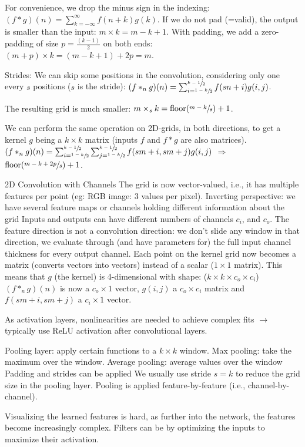 For convenience, we drop the minus sign in the indexing: $(f*g)(n)= \sum_{k=-\infty}^{\infty} f(n+k)g(k)$.
If we do not pad (=valid), the output is smaller than the input:
$m\times k=m-k+1$.
With  padding, we add a zero-padding of size $p=\frac{(k-1)}{2}$ on both ends: $(m+p)\times k = (m-k+1)+2p = m$.

Strides: We can skip some positions in the convolution, considering only one every $s$ positions ($s$ is the stride):
$(f*_n g)(n)= \sum_{i=\sfrac{1-k}{2}}^{\sfrac{k-1}{2}} f(sn+i)g(i,j)$.

The resulting grid is much smaller: $m\times_s k = \mathrm{floor}{(\sfrac{m-k}{s})}+1$.

We can perform the same operation on 2D-grids, in both directions, to get a kernel $g$ being a $k\times k$ matrix (inputs $f$ and $f*g$ are also matrices).
$(f*_n g)(n)= \sum_{i=\sfrac{1-k}{2}}^{\sfrac{k-1}{2}} \sum_{j=\sfrac{1-k}{2}}^{\sfrac{k-1}{2}} f(sm+i, sm+j)g(i,j)$ $\Rightarrow$ $\mathrm{floor}{(\sfrac{m-k+2p}{s})}+1$.

2D Convolution with Channels
The grid is now vector-valued, i.e., it has multiple features per point (eg: RGB image: 3 values per pixel).
Inverting perspective: we have several feature maps or channels holding different information about the grid
Inputs and outputs can have different numbers of channels $c_i$, and $c_o$.
The feature direction is not a convolution direction: we don’t slide any window in that direction, we evaluate through (and have parameters for) the full input channel thickness for every output channel.
Each point on the kernel grid now becomes a matrix (converts vectors into vectors) instead of a scalar ($1\times 1$ matrix).
This means that $g$ (the kernel) is 4-dimensional with shape: ($k \times k \times c_o \times c_i$)
$(f*_n g)(n)$ is now a $c_o\times 1$ vector, $g(i,j)$ a $c_o \times c_i$ matrix and $f(sm+i, sm+j)$ a $c_i\times 1$ vector.

As activation layers, nonlinearities are needed to achieve complex fits $\rightarrow$ typically use ReLU activation after convolutional layers.

Pooling layer: apply certain functions to a $k\times k$ window.
Max pooling: take the maximum over the window.
Average pooling: average values over the window
Padding and strides can be applied
We usually use stride $s=k$ to reduce the grid size in the pooling layer.
Pooling is applied feature-by-feature (i.e., channel-by-channel).

Visualizing the learned features is hard, as further into the network, the features become increasingly complex. 
Filters can be  by optimizing the inputs to maximize their activation.

